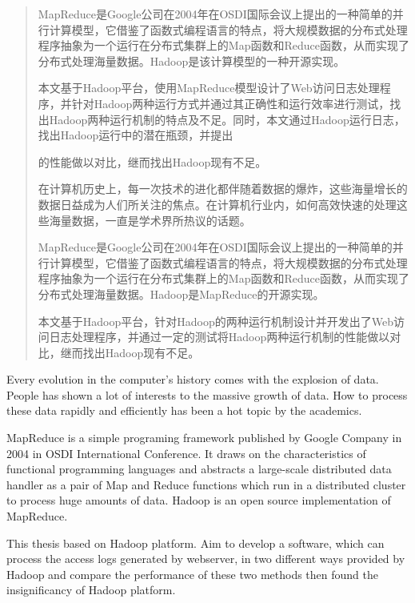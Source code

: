 \begin{abstract}
MapReduce是Google公司在2004年在OSDI国际会议上提出的一种简单的并行计算模型，它借鉴了函数式编程语言的特点，将大规模数据的分布式处理程序抽象为一个运行在分布式集群上的Map函数和Reduce函数，从而实现了分布式处理海量数据。Hadoop是该计算模型的一种开源实现。


本文基于Hadoop平台，使用MapReduce模型设计了Web访问日志处理程序，并针对Hadoop两种运行方式并通过其正确性和运行效率进行测试，找出Hadoop两种运行机制的特点及不足。同时，本文通过Hadoop运行日志，找出Hadoop运行中的潜在瓶颈，并提出

的性能做以对比，继而找出Hadoop现有不足。



在计算机历史上，每一次技术的进化都伴随着数据的爆炸，这些海量增长的数据日益成为人们所关注的焦点。在计算机行业内，如何高效快速的处理这些海量数据，一直是学术界所热议的话题。

MapReduce是Google公司在2004年在OSDI国际会议上提出的一种简单的并行计算模型，它借鉴了函数式编程语言的特点，将大规模数据的分布式处理程序抽象为一个运行在分布式集群上的Map函数和Reduce函数，从而实现了分布式处理海量数据。Hadoop是MapReduce的开源实现。

本文基于Hadoop平台，针对Hadoop的两种运行机制设计并开发出了Web访问日志处理程序，并通过一定的测试将Hadoop两种运行机制的性能做以对比，继而找出Hadoop现有不足。

\end{abstract}

\begin{englishabstract}
Every evolution in the computer's history comes with the explosion of data. People has shown a lot of interests to the massive growth of data. How to process these data rapidly and efficiently has been a hot topic by the academics. 

MapReduce is a simple programing framework published by Google Company in 2004 in OSDI International Conference. It draws on the characteristics of functional programming languages​​ and abstracts a large-scale distributed data handler as a pair of Map and Reduce functions which run in a distributed cluster to process huge amounts of data. Hadoop is an open source implementation of MapReduce.

This thesis based on Hadoop platform. Aim to develop a software, which can process the access logs generated by webserver, in two different ways provided by Hadoop and compare the performance of these two methods then found the insignificancy of Hadoop platform.

\end{englishabstract}

